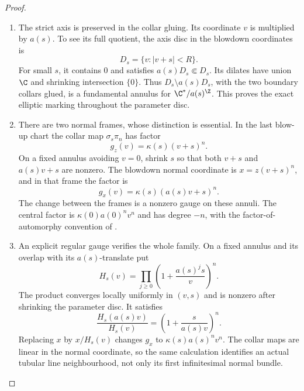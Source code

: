 \begin{proof}
\begin{enumerate}[label=\arabic*.,leftmargin=*]
\item The strict axis is preserved in the collar gluing. Its coordinate
$v$ is multiplied by $a(s)$. To see its full quotient, the axis disc
in the blowdown coordinates is
\[
 D_s=\{v:|v+s|<R\}.
\]
For small $s$, it contains $0$ and satisfies $a(s)D_s\Subset D_s$.
Its dilates have union $\C$ and shrinking intersection $\{0\}$.
Thus $D_s\setminus a(s)D_s$, with the two boundary collars glued,
is a fundamental annulus for $\C^*/a(s)^\Z$.
This proves the exact elliptic marking throughout the parameter disc.

\item There are two normal frames, whose distinction is essential.
In the last blow-up chart the collar map $\sigma_s\pi_n$ has factor
\[
 g_z(v)=\kappa(s)(v+s)^n.
\]
On a fixed annulus avoiding $v=0$, shrink $s$ so that both
$v+s$ and $a(s)v+s$ are nonzero. The blowdown normal coordinate is
$x=z(v+s)^n$, and in that frame the factor is
\[
 g_x(v)=\kappa(s)(a(s)v+s)^n.
\]
The change between the frames is a nonzero gauge on these annuli.
The central factor is $\kappa(0)a(0)^n v^n$ and has degree $-n$,
with the factor-of-automorphy convention of
\citet[Proposition 5.6, pp.1369--1370]{IstratiEtAl2022Root}.

\item An explicit regular gauge verifies the whole family. On a fixed
annulus and its overlap with its $a(s)$-translate put
\[
 H_s(v)=\prod_{j\ge0}\left(1+\frac{a(s)^j s}{v}\right)^n.
\]
The product converges locally uniformly in $(v,s)$ and is nonzero
after shrinking the parameter disc. It satisfies
\[
 \frac{H_s(a(s)v)}{H_s(v)}
      =\left(1+\frac{s}{a(s)v}\right)^n.
\]
Replacing $x$ by $x/H_s(v)$ changes $g_x$ to
$\kappa(s)a(s)^n v^n$.
The collar maps are linear in the normal coordinate, so the same
calculation identifies an actual tubular line neighbourhood, not
only its first infinitesimal normal bundle.


\end{enumerate}
\end{proof}
